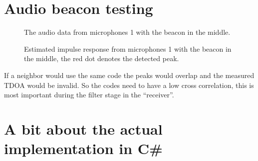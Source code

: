 \documentclass[final]{scrreprt} %
\begin{document}
\section{Audio beacon testing}
\begin{figure}[H]
	\centering
	\setlength\figureheight{4cm}
    	\setlength{}
	
	\caption{The audio data from microphones 1 with the beacon in the middle.}
	\label{fig:one-signal}
\end{figure}
\begin{figure}[H]
	\centering
	\setlength\figureheight{4cm}
    	\setlength{}
	
	\caption{Estimated impulse response from microphones 1 with the beacon in the middle, the red dot denotes the detected peak.}
	\label{fig:impulse-with-peak}
\end{figure}
If a neighbor would use the same code the peaks would overlap and the measured TDOA would be invalid.
So the codes need to have a low cross correlation, this is most important during the filter stage in the ``receiver''.
\section{A bit about the actual implementation in C\#}
\end{document}
